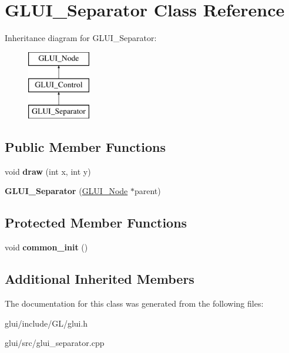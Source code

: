 \hypertarget{classGLUI__Separator}{\section{G\-L\-U\-I\-\_\-\-Separator Class Reference}
\label{classGLUI__Separator}
}
Inheritance diagram for G\-L\-U\-I\-\_\-\-Separator\-:\begin{figure}[H]
\begin{center}
\leavevmode
\includegraphics[height=3.000000cm]{classGLUI__Separator}
\end{center}
\end{figure}
\subsection*{Public Member Functions}
\begin{DoxyCompactItemize}
\item 
\hypertarget{classGLUI__Separator_aff41b79985e74c612fd1445aa8f841e6}{void {\bfseries draw} (int x, int y)}\label{classGLUI__Separator_aff41b79985e74c612fd1445aa8f841e6}

\item 
\hypertarget{classGLUI__Separator_aaa4d14c71c705d582f84e2f33a31609c}{{\bfseries G\-L\-U\-I\-\_\-\-Separator} (\hyperlink{classGLUI__Node}{G\-L\-U\-I\-\_\-\-Node} $\ast$parent)}\label{classGLUI__Separator_aaa4d14c71c705d582f84e2f33a31609c}

\end{DoxyCompactItemize}
\subsection*{Protected Member Functions}
\begin{DoxyCompactItemize}
\item 
\hypertarget{classGLUI__Separator_a45dd556a76d5492f16d071b6c250fcf5}{void {\bfseries common\-\_\-init} ()}\label{classGLUI__Separator_a45dd556a76d5492f16d071b6c250fcf5}

\end{DoxyCompactItemize}
\subsection*{Additional Inherited Members}


The documentation for this class was generated from the following files\-:\begin{DoxyCompactItemize}
\item 
glui/include/\-G\-L/glui.\-h\item 
glui/src/glui\-\_\-separator.\-cpp\end{DoxyCompactItemize}
